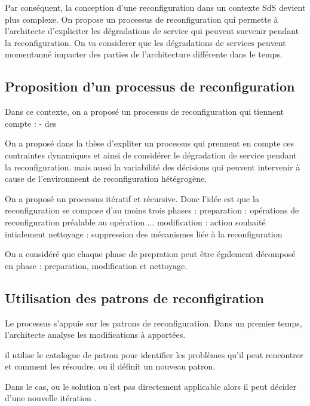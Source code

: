 Par conséquent, la conception d'une reconfiguration dans un contexte
SdS devient plus complexe. On propose un processus de reconfiguration
qui permette à l'architecte d'expliciter les dégradations de service
qui peuvent survenir pendant la reconfiguration. On va considerer que
les dégradations de services peuvent momentanné impacter des parties
de l'architecture différente dans le temps. 



\subsection{Proposition d'un processus de reconfiguration}
Dans ce contexte, on a proposé un processus de reconfiguration qui
tiennent compte :
- des 

On a proposé dans la thèse d'expliter un processus qui prennent en
compte ces contraintes dynamiques et ainsi de considérer le dégradation
de service pendant la reconfiguration. mais aussi la variabilité des
décisions qui peuvent intervenir à cause de l'environneent de
reconfiguration hétégrogène. 

On a proposé un processus itératif et récursive. Donc l'idée est que
la reconfiguration se compose d'au moins trois phases : 
preparation : opérations de reconfiguration préalable au opération ...
modification : action souhaité intialement
nettoyage : suppression des mécanismes liée à la reconfiguration 

On a considéré que chaque phase de prepration peut être également
décomposé en phase : preparation, modification et nettoyage. 


\subsection{Utilisation des patrons de reconfigiration}

Le processus s'appuie sur les patrons de reconfiguration. Dans un
premier temps, l'architecte analyse les modifications à apportées. 

il utilise le catalogue de patron pour identifier les problèmes qu'il
peut rencontrer et comment les résoudre. ou il définit un nouveau
patron. 

Dans le cas, ou le solution n'est pas directement applicable alors il
peut décider d'une nouvelle itération .
